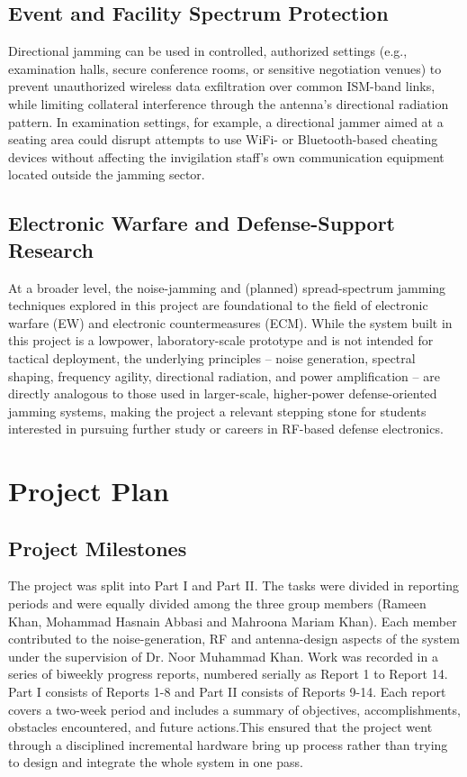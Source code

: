 \documentclass[12pt,a4paper]{report}
\begin{document}
	\subsection{Event and Facility Spectrum Protection}
	Directional jamming can be used in controlled, authorized settings (e.g., examination halls, secure conference rooms, or sensitive negotiation venues) to prevent unauthorized wireless data exfiltration over common ISM-band links, while limiting collateral interference through the antenna’s directional radiation pattern. In examination settings, for example, a directional jammer aimed at a seating area could disrupt attempts to use WiFi- or Bluetooth-based cheating devices without affecting the invigilation staff’s own communication equipment located outside the jamming sector.
	\subsection{Electronic Warfare and Defense-Support Research}
	At a broader level, the noise-jamming and (planned) spread-spectrum jamming techniques explored in this project are foundational to the field of electronic warfare (EW) and electronic countermeasures (ECM). While the system built in this project is a lowpower, laboratory-scale prototype and is not intended for tactical deployment, the underlying principles – noise generation, spectral shaping, frequency agility, directional radiation, and power amplification – are directly analogous to those used in larger-scale, higher-power defense-oriented jamming systems, making the project a relevant stepping stone for students interested in pursuing further study or careers in RF-based defense electronics.
	\section{Project Plan}
	\subsection{Project Milestones}
	The project was split into Part I and Part II. The tasks were divided in reporting periods and were equally divided among the three group members (Rameen Khan, Mohammad Hasnain Abbasi and Mahroona Mariam Khan). Each member contributed to the noise-generation, RF and antenna-design aspects of the system under the supervision of Dr. Noor Muhammad Khan. Work was recorded in a series of biweekly progress reports, numbered serially as Report 1 to Report 14. Part I consists of Reports 1-8 and Part II consists of Reports 9-14. Each report covers a two-week period and includes a summary of objectives, accomplishments, obstacles encountered, and future actions.This ensured that the project went through a disciplined incremental hardware bring up process rather than trying to design and integrate the whole system in one pass.
	
\end{document}
